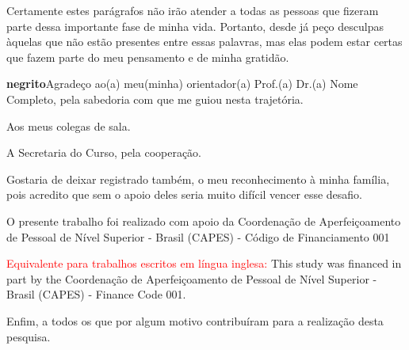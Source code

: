 
\begin{agradecimentos}%

Certamente estes parágrafos não irão atender a todas as pessoas que fizeram parte dessa importante fase de minha vida. Portanto, desde já peço desculpas àquelas que não estão presentes entre essas palavras, mas elas podem estar certas que fazem parte do meu pensamento e de minha gratidão. 

\textbf{negrito}Agradeço ao(a) meu(minha) orientador(a) Prof.(a) Dr.(a) Nome Completo, pela sabedoria com que me guiou nesta trajetória.

Aos meus colegas de sala.

A Secretaria do Curso, pela cooperação.

Gostaria de deixar registrado também, o meu reconhecimento à minha família, pois acredito que sem o apoio deles seria muito difícil vencer esse desafio. 

O presente trabalho foi realizado com apoio da Coordenação de Aperfeiçoamento de Pessoal de Nível Superior - Brasil (CAPES) - Código de Financiamento 001

\textcolor{red}{Equivalente para trabalhos escritos em língua inglesa:} This study was financed in part by the Coordenação de Aperfeiçoamento de Pessoal de Nível Superior - Brasil (CAPES) - Finance Code 001.

Enfim, a todos os que por algum motivo contribuíram para a realização desta pesquisa.



\end{agradecimentos}
